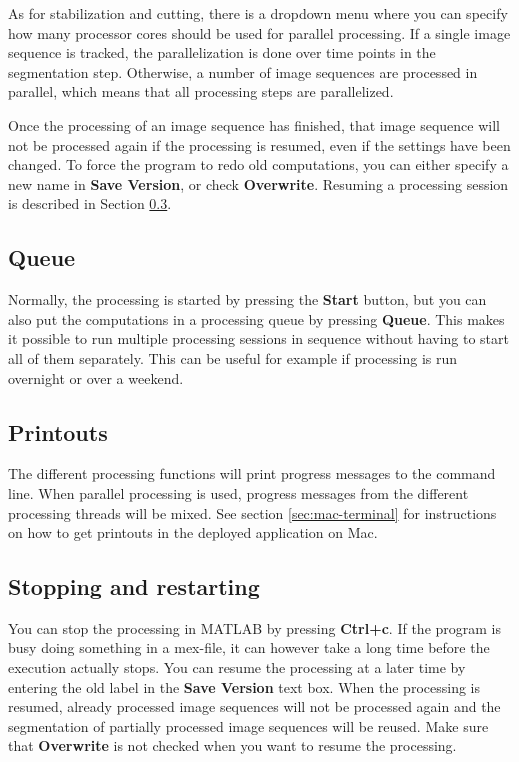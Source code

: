 \documentclass[a4paper, oneside, onecolumn, 11pt]{article}
\newcommand{\command}[1]{\textbf{#1}}
\newcommand{\control}[1]{\textbf{#1}}
\begin{document}
As for stabilization and cutting, there is a dropdown menu where you can specify how many processor cores should be used for parallel processing. If a single image sequence is tracked, the parallelization is done over time points in the segmentation step. Otherwise, a number of image sequences are processed in parallel, which means that all processing steps are parallelized.

Once the processing of an image sequence has finished, that image sequence will not be processed again if the processing is resumed, even if the settings have been changed. To force the program to redo old computations, you can either specify a new name in \control{Save Version}, or check \control{Overwrite}. Resuming a processing session is described in Section \ref{sec:resume}.

\subsection{Queue}
\label{sec:queue}
Normally, the processing is started by pressing the \control{Start} button, but you can also put the computations in a processing queue by pressing \control{Queue}. This makes it possible to run multiple processing sessions in sequence without having to start all of them separately. This can be useful for example if processing is run overnight or over a weekend.

\subsection{Printouts}
The different processing functions will print progress messages to the command line. When parallel processing is used, progress messages from the different processing threads will be mixed. See section \ref{sec:mac-terminal} for instructions on how to get printouts in the deployed application on Mac.

\subsection{Stopping and restarting}
\label{sec:resume}
You can stop the processing in MATLAB by pressing \command{Ctrl+c}. If the program is busy doing something in a mex-file, it can however take a long time before the execution actually stops. You can resume the processing at a later time by entering the old label in the \control{Save Version} text box. When the processing is resumed, already processed image sequences will not be processed again and the segmentation of partially processed image sequences will be reused. Make sure that \control{Overwrite} is not checked when you want to resume the processing.
\end{document}
